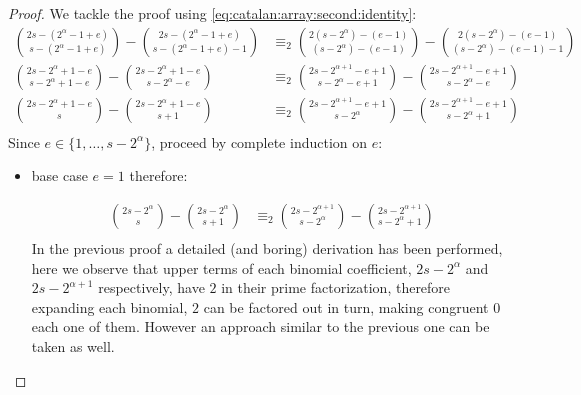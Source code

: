 \begin{proof}
We tackle the proof using \autoref{eq:catalan:array:second:identity}:
\begin{displaymath}
    \begin{split}
        {{2s-(2^{{\alpha}}-1+e)}\choose{s-(2^{{\alpha}}-1+e)}} - {{2s-(2^{{\alpha}}-1+e)}\choose{s-(2^{{\alpha}}-1+e)-1}}
        &\equiv_{2}
        {{2(s-2^{{\alpha}})-(e-1)}\choose{(s-2^{{\alpha}})-(e-1)}} - {{2(s-2^{{\alpha}})-(e-1)}\choose{(s-2^{{\alpha}})-(e-1)-1}}\\
        {{2s-2^{{\alpha}}+1-e}\choose{s-2^{{\alpha}}+1-e}} - {{2s-2^{{\alpha}}+1-e}\choose{s-2^{{\alpha}}-e}}
        &\equiv_{2}
        {{2s-2^{{\alpha}+1}-e+1}\choose{s-2^{{\alpha}}-e+1}} - {{2s-2^{{\alpha}+1}-e+1}\choose{s-2^{{\alpha}}-e}}\\
        {{2s-2^{{\alpha}}+1-e}\choose{s}} - {{2s-2^{{\alpha}}+1-e}\choose{s+1}}
        &\equiv_{2}
        {{2s-2^{{\alpha}+1}-e+1}\choose{s-2^{{\alpha}}}} - {{2s-2^{{\alpha}+1}-e+1}\choose{s-2^{{\alpha}}+1}}\\
    \end{split}
\end{displaymath}
Since $e\in\lbrace1,\ldots,s-2^{{\alpha}}\rbrace$, proceed by complete induction on $e$:
    \begin{itemize}
        \item base case $e=1$ therefore:

            \begin{displaymath}
                \begin{split}
                    {{2s-2^{{\alpha}}}\choose{s}} - {{2s-2^{{\alpha}}}\choose{s+1}}
                    &\equiv_{2}
                    {{2s-2^{{\alpha}+1}}\choose{s-2^{{\alpha}}}} - {{2s-2^{{\alpha}+1}}\choose{s-2^{{\alpha}}+1}}\\
                \end{split}
            \end{displaymath}
            In the previous proof a detailed (and boring) derivation has been performed,
            here we observe that upper terms of each binomial coefficient, $2s-2^{{\alpha}}$
            and $2s-2^{{\alpha}+1}$ respectively, have $2$ in their prime factorization, therefore
            expanding each binomial, $2$ can be factored out in turn, making congruent $0$
            each one of them. However an approach similar to the previous one can be
            taken as well.


\end{itemize}
\end{proof}
